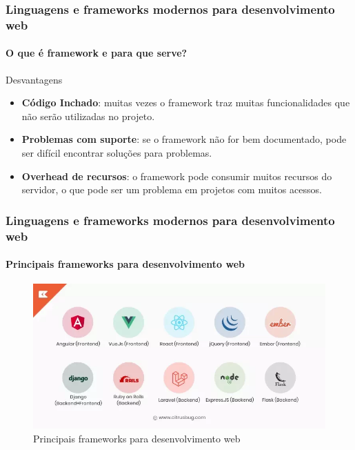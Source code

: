 \documentclass[
	9pt, %
	t, %
]{beamer}
\begin{document}
\begin{frame}
	\frametitle{Linguagens e frameworks modernos para desenvolvimento web}
	\framesubtitle{O que é framework e para que serve?}

	\begin{alertblock}{Desvantagens}
		\begin{itemize}
			\item \textbf{Código Inchado}: muitas vezes o framework traz muitas funcionalidades que não serão utilizadas no projeto.
			\item \textbf{Problemas com suporte}: se o framework não for bem documentado, pode ser difícil encontrar soluções para problemas.
			\item \textbf{Overhead de recursos}: o framework pode consumir muitos recursos do servidor, o que pode ser um problema em projetos com muitos acessos.
		\end{itemize}
	\end{alertblock}

\end{frame}

\begin{frame}
	\frametitle{Linguagens e frameworks modernos para desenvolvimento web}
	\framesubtitle{Principais frameworks para desenvolvimento web}

	\begin{figure}
		\centering
		\includegraphics[width=0.9\linewidth]{frameworks_web.png}
		\caption{Principais frameworks para desenvolvimento web}
		\label{fig:frameworks}
	\end{figure}

\end{frame}
\end{document}
